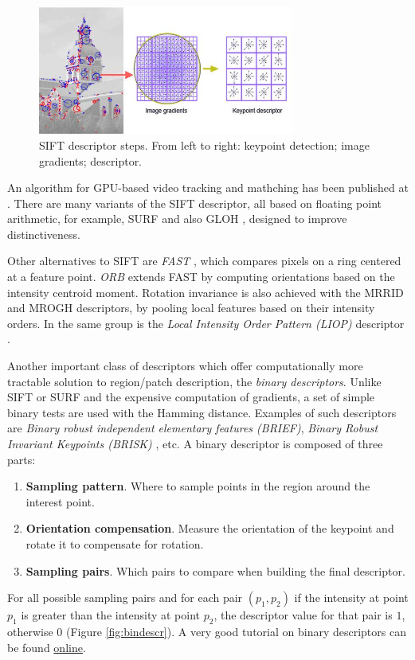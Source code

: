 \begin{figure}[H]
\begin{center}
\includegraphics[width=0.75\textwidth]{fig/SIFT}
\end{center}
\caption{SIFT descriptor steps. From left to right: keypoint detection; image gradients; descriptor.}
\label{fig:sift}
\end{figure}

An algorithm for GPU-based video tracking and mathching has been published at \cite{Sinha06gpu-basedvideo}. There are many variants of the SIFT descriptor, all based on floating point arithmetic, for example, SURF\cite{Bay:2008:SURF} and also GLOH \cite{MS05}, designed to improve distinctiveness.  

Other alternatives to SIFT are {\em FAST} \cite{Rosten:2006}, which compares pixels on a ring centered at a feature point. {\em  ORB} \cite{Rublee:2011} extends FAST by computing orientations based on the intensity centroid moment. Rotation invariance is also achieved with the MRRID and MROGH descriptors, \cite{journals:pami:FanWH12} by pooling local features based on their intensity orders. In the same group is the {\em Local Intensity Order Pattern (LIOP)} descriptor \cite{ZhenhuaWang:2011:LIO}. 

Another important class of descriptors which offer computationally more tractable solution to region/patch description, the {\em binary descriptors}. Unlike SIFT or SURF and the expensive computation of gradients, a set of simple binary tests are used with the Hamming distance. Examples of such descriptors are {\em Binary robust independent elementary features (BRIEF)}\cite{Calonder:2010}, {\em Binary Robust Invariant Keypoints (BRISK)} \cite{Leutenegger:2011}, etc. A binary descriptor is composed of three parts:
\begin{enumerate}
\item{\bf Sampling pattern}. Where to sample points in the region around the interest point.
\item{\bf Orientation compensation}. Measure the orientation of the keypoint and rotate it to compensate for rotation.
\item{\bf Sampling pairs}. Which pairs to compare when building the final descriptor.
\end{enumerate}
For all possible sampling pairs and for each pair $(p_1, p_2)$ if the intensity at point $p_1$ is greater than the intensity at point $p_2$, the descriptor value for that pair is $1$, otherwise $0$ (Figure \ref{fig:bindescr}). A very good tutorial on binary descriptors can be found \href{https://gilscvblog.wordpress.com/?s=descriptors}{online}. 

